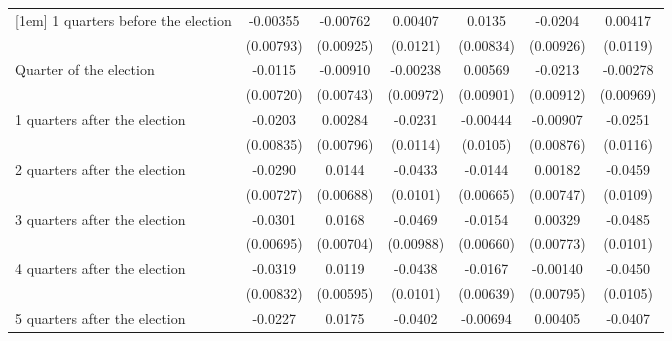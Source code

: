 \begin{table}[!ht]
\begin{tabular}{l*{6}{c}}
[1em]
 1 quarters before the election&    -0.00355         &    -0.00762         &     0.00407         &      0.0135         &     -0.0204\sym{*}  &     0.00417         \\
                    &   (0.00793)         &   (0.00925)         &    (0.0121)         &   (0.00834)         &   (0.00926)         &    (0.0119)         \\
[1em]
Quarter of the election&     -0.0115         &    -0.00910         &    -0.00238         &     0.00569         &     -0.0213\sym{*}  &    -0.00278         \\
                    &   (0.00720)         &   (0.00743)         &   (0.00972)         &   (0.00901)         &   (0.00912)         &   (0.00969)         \\
[1em]
 1 quarters after the election&     -0.0203\sym{*}  &     0.00284         &     -0.0231\sym{*}  &    -0.00444         &    -0.00907         &     -0.0251\sym{*}  \\
                    &   (0.00835)         &   (0.00796)         &    (0.0114)         &    (0.0105)         &   (0.00876)         &    (0.0116)         \\
[1em]
 2 quarters after the election&     -0.0290\sym{***}&      0.0144\sym{*}  &     -0.0433\sym{***}&     -0.0144\sym{*}  &     0.00182         &     -0.0459\sym{***}\\
                    &   (0.00727)         &   (0.00688)         &    (0.0101)         &   (0.00665)         &   (0.00747)         &    (0.0109)         \\
[1em]
 3 quarters after the election&     -0.0301\sym{***}&      0.0168\sym{*}  &     -0.0469\sym{***}&     -0.0154\sym{*}  &     0.00329         &     -0.0485\sym{***}\\
                    &   (0.00695)         &   (0.00704)         &   (0.00988)         &   (0.00660)         &   (0.00773)         &    (0.0101)         \\
[1em]
 4 quarters after the election&     -0.0319\sym{***}&      0.0119\sym{*}  &     -0.0438\sym{***}&     -0.0167\sym{**} &    -0.00140         &     -0.0450\sym{***}\\
                    &   (0.00832)         &   (0.00595)         &    (0.0101)         &   (0.00639)         &   (0.00795)         &    (0.0105)         \\
[1em]
 5 quarters after the election&     -0.0227\sym{**} &      0.0175         &     -0.0402\sym{**} &    -0.00694         &     0.00405         &     -0.0407\sym{**} \\

\end{tabular}
\end{table}
